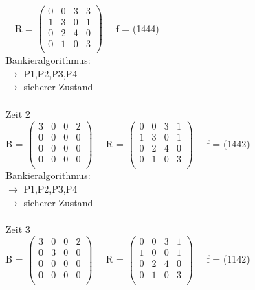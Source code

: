 \documentclass[10pt,a4paper]{scrartcl}
\begin{document}
	\ \ R =
	$\left( \begin{array}{rrrr}
	0 & 0 & 3 & 3 \\
	1 & 3 & 0 & 1 \\
	0 & 2 & 4 & 0 \\
	0 & 1 & 0 & 3 \\
	\end{array}\right) $ 
	\ \ f = (1444)\\
	Bankieralgorithmus:\\
	$\rightarrow$ P1,P2,P3,P4\\
	$\rightarrow$ sicherer Zustand
	\\\\Zeit 2\\
	B =
	$\left( \begin{array}{rrrr}
	3 & 0 & 0 & 2 \\
	0 & 0 & 0 & 0 \\
	0 & 0 & 0 & 0 \\
	0 & 0 & 0 & 0 \\
	\end{array}\right) $
	\ \ R =
	$\left( \begin{array}{rrrr}
	0 & 0 & 3 & 1 \\
	1 & 3 & 0 & 1 \\
	0 & 2 & 4 & 0 \\
	0 & 1 & 0 & 3 \\
	\end{array}\right) $ 
	\ \ f = (1442)\\
	Bankieralgorithmus:\\
	$\rightarrow$ P1,P2,P3,P4\\
	$\rightarrow$ sicherer Zustand
	\\\\Zeit 3\\
	B =
	$\left( \begin{array}{rrrr}
	3 & 0 & 0 & 2 \\
	0 & 3 & 0 & 0 \\
	0 & 0 & 0 & 0 \\
	0 & 0 & 0 & 0 \\
	\end{array}\right) $
	\ \ R =
	$\left( \begin{array}{rrrr}
	0 & 0 & 3 & 1 \\
	1 & 0 & 0 & 1 \\
	0 & 2 & 4 & 0 \\
	0 & 1 & 0 & 3 \\
	\end{array}\right) $ 
	\ \ f = (1142)\\
\end{document}
